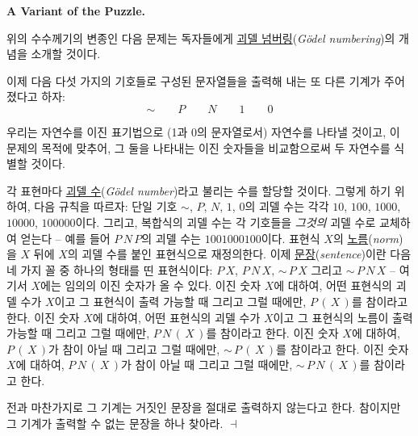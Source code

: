 \documentclass[12pt]{paper}
\newenvironment{context}[1][]
{ \noindent \textbf{{#1}.}
}
{ \hfill $ \dashv $
}
\begin{document}
  \begin{context}[A Variant of the Puzzle]
    위의 수수께기의 변종인 다음 문제는 독자들에게 \underline{괴델 넘버링}(\textit{G\"odel numbering})의 개념을 소개할 것이다.

    이제 다음 다섯 가지의 기호들로 구성된 문자열들을 출력해 내는 또 다른 기계가 주어졌다고 하자:
    $$ \sim \qquad P \qquad N \qquad 1 \qquad 0 $$

    우리는 자연수를 이진 표기법으로 (1과 0의 문자열로서) 자연수를 나타낼 것이고,
    이 문제의 목적에 맞추어,
    그 둘을 나타내는 이진 숫자들을 비교함으로써 두 자연수를 식별할 것이다.

    각 표현마다 \underline{괴델 수}(\textit{G\"odel number})라고 불리는 수를 할당할 것이다.
    그렇게 하기 위하여, 다음 규칙을 따르자:
    단일 기호 $\sim$, $P$, $N$, $1$, $0$의 괴델 수는 각각 $10$, $100$, $1000$, $10000$, $100000$이다.
    그리고, 복합식의 괴델 수는 각 기호들을 \textit{그것의} 괴델 수로 교체하여 얻는다 --
    예를 들어 $P \, N \, P$의 괴델 수는 $1001000100$이다.
    표현식 $X$의 \underline{노름}(\textit{norm})을 $X$ 뒤에 $X$의 괴델 수를 붙인 표현식으로 재정의한다.
    이제 \underline{문장}(\textit{sentence})이란 다음 네 가지 꼴 중 하나의 형태를 띤 표현식이다:
    $P \, X$, $P \, N \, X$, $\sim \, P \, X$ 그리고 $\sim \, P \, N \, X$ --
    여기서 $X$에는 임의의 이진 숫자가 올 수 있다.
    이진 숫자 $X$에 대하여, 어떤 표현식의 괴델 수가 $X$이고 그 표현식이 출력 가능할 때 그리고 그럴 때에만,
    $P \, \left( \, X \, \right)$를 참이라고 한다.
    이진 숫자 $X$에 대하여, 어떤 표현식의 괴델 수가 $X$이고 그 표현식의 노름이 출력 가능할 때 그리고 그럴 때에만,
    $P \, N \, \left( \, X \, \right)$를 참이라고 한다.
    이진 숫자 $X$에 대하여, $P \, \left( \, X \, \right)$가 참이 아닐 때 그리고 그럴 때에만,
    $\sim \, P \, \left( \, X \, \right)$를 참이라고 한다.
    이진 숫자 $X$에 대하여, $P \, N \, \left( \, X \, \right)$가 참이 아닐 때 그리고 그럴 때에만,
    $\sim \, P \, N \, \left( \, X \, \right)$를 참이라고 한다.

    전과 마찬가지로 그 기계는 거짓인 문장을 절대로 출력하지 않는다고 한다.
    참이지만 그 기계가 출력할 수 없는 문장을 하나 찾아라.
  \end{context}
\end{document}
